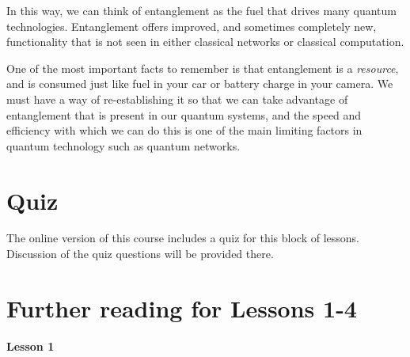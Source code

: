 In this way, we can think of entanglement as the fuel that drives many quantum technologies. Entanglement offers improved, and sometimes completely new, functionality that is not seen in either classical networks or classical computation.

One of the most important facts to remember is that entanglement is a \emph{resource}, and is consumed just like fuel in your car or battery charge in your camera. We must have a way of re-establishing it so that we can take advantage of entanglement that is present in our quantum systems, and the speed and efficiency with which we can do this is one of the main limiting factors in quantum technology such as quantum networks.


\newpage
\begin{exercises}


\end{exercises}


\newpage
\section*{Quiz}


The online version of this course includes a quiz for this block of lessons. Discussion of the quiz questions will be provided there.

\section*{Further reading for Lessons 1-4}

{\bf Lesson 1}\\

